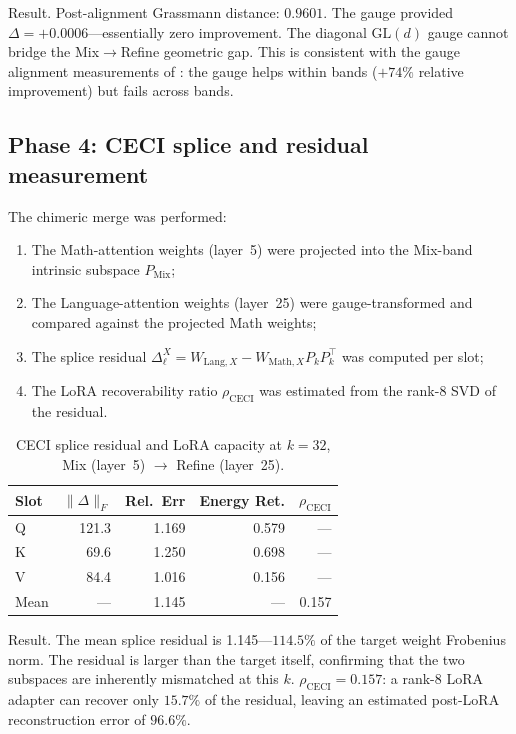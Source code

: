 \documentclass[11pt]{article}
\begin{document}
Result.  Post-alignment Grassmann distance: $\mathbf{0.9601}$.
The gauge provided $\Delta{=}{+}0.0006$---essentially zero
improvement.  The diagonal $\mathrm{GL}(d)$ gauge cannot bridge the
Mix$\to$Refine geometric gap.  This is consistent with the gauge
alignment measurements of : the gauge helps
within bands ($+74\%$ relative improvement) but fails across bands.

\subsection{Phase 4: CECI splice and residual measurement}

The chimeric merge was performed:
\begin{enumerate}
\item The Math-attention weights (layer~5) were projected into the
      Mix-band intrinsic subspace $P_{\mathrm{Mix}}$;
\item The Language-attention weights (layer~25) were gauge-transformed
      and compared against the projected Math weights;
\item The splice residual $\Delta_\ell^X = W_{\mathrm{Lang},X} -
      W_{\mathrm{Math},X} P_k P_k^\top$ was computed per slot;
\item The LoRA recoverability ratio $\rho_{\mathrm{CECI}}$ was
      estimated from the rank-8 SVD of the residual.
\end{enumerate}

\begin{table}[h]\centering\small
\caption{CECI splice residual and LoRA capacity at $k{=}32$,
Mix (layer~5) $\to$ Refine (layer~25).}
\label{tab:ceci-splice}
\begin{tabular}{@{}lrrrr@{}}
\toprule
Slot & $\|\Delta\|_F$ & Rel.\ Err & Energy Ret. & $\rho_{\mathrm{CECI}}$ \\
\midrule
Q & 121.3 & 1.169 & 0.579 & --- \\
K & 69.6  & 1.250 & 0.698 & --- \\
V & 84.4  & 1.016 & 0.156 & --- \\
\midrule
Mean & --- & 1.145 & --- & 0.157 \\
\bottomrule
\end{tabular}
\end{table}

Result.  The mean splice residual is 1.145---$114.5\%$
of the target weight Frobenius norm.  The residual is larger than
the target itself, confirming that the two subspaces are inherently
mismatched at this $k$.  $\rho_{\mathrm{CECI}}{=}0.157$: a rank-8 LoRA
adapter can recover only $15.7\%$ of the residual, leaving an estimated
post-LoRA reconstruction error of $96.6\%$.
\end{document}

